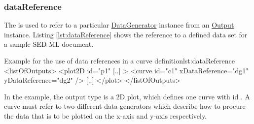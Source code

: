 \subsubsection{dataReference}
\label{sec:dataReference}
The  is used to refer to a particular \hyperref[class:dataGenerator]{DataGenerator} instance from an \hyperref[class:output]{Output} instance. 
Listing \ref{lst:dataReference} shows the reference to a defined data set for a sample SED-ML document. 
%
\begin{myXmlLst}{Example for the use of data references in a curve definition}{lst:dataReference}
<listOfOutputs>
  <plot2D id="p1" [..] >
    <curve id="c1" xDataReference="dg1" yDataReference="dg2" />
    [..]
  </plot>
</listOfOutputs>
\end{myXmlLst}
%
In the example, the output type is a 2D plot, which defines one curve with id . A curve must refer to two different data generators which describe how to procure the data that is to be plotted on the x-axis and y-axis respectively. 

